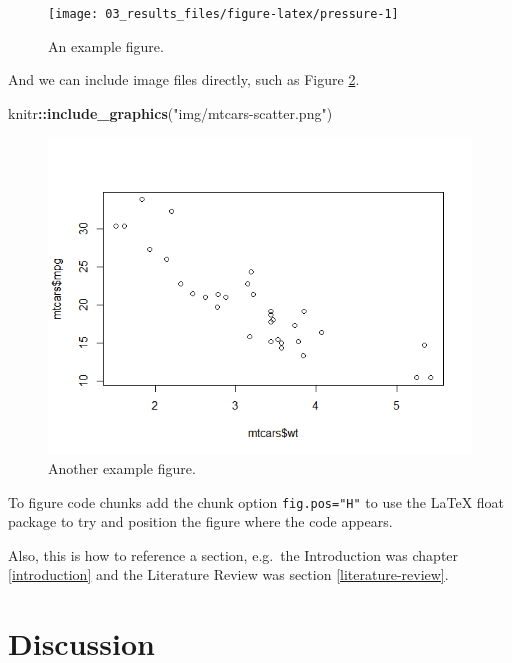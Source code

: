 \documentclass[
  openany]{book}
\newenvironment{Shaded}{\begin{snugshade}}{\end{snugshade}}
\newcommand{\KeywordTok}[1]{\textcolor[rgb]{0.13,0.29,0.53}{\textbf{#1}}}
\newcommand{\NormalTok}[1]{#1}
\newcommand{\OperatorTok}[1]{\textcolor[rgb]{0.81,0.36,0.00}{\textbf{#1}}}
\newcommand{\StringTok}[1]{\textcolor[rgb]{0.31,0.60,0.02}{#1}}
\begin{document}
\begin{figure}[H]

{\centering \texttt{[image: 03\_results\_files/figure-latex/pressure-1]} 

}

\caption{An example figure.}\label{fig:pressure}
\end{figure}

And we can include image files directly, such as Figure \ref{fig:knitlogo}.

\begin{Shaded}
\begin{Highlighting}[]
\NormalTok{knitr}\OperatorTok{::}\KeywordTok{include_graphics}\NormalTok{(}\StringTok{"img/mtcars-scatter.png"}\NormalTok{)}
\end{Highlighting}
\end{Shaded}

\begin{figure}

{\centering \includegraphics[width=0.75\linewidth]{img/mtcars-scatter} 

}

\caption{Another example figure.}\label{fig:knitlogo}
\end{figure}

To figure code chunks add the chunk option \texttt{fig.pos="H"} to use the LaTeX float package to try and position the figure where the code appears.

Also, this is how to reference a section, e.g.~the Introduction was chapter \ref{introduction} and the Literature Review was section \ref{literature-review}.

\hypertarget{discussion}{%
\chapter{Discussion}\label{discussion}}
\end{document}
